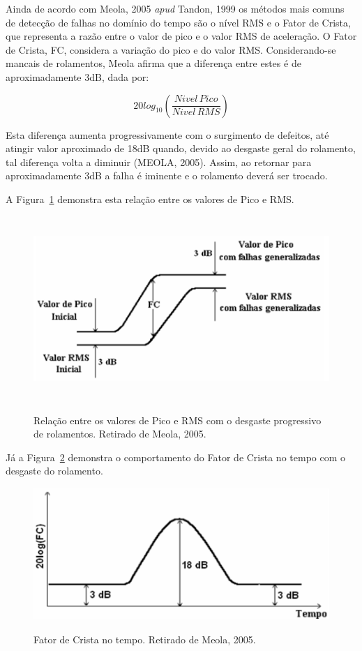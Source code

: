 \documentclass[
	12pt,				
	oneside,			
	a4paper,			
	english,			
	brazil,			
	]{abntex2ppgsi}
\begin{document}
Ainda de acordo com Meola, 2005 \textit{apud} Tandon, 1999 os métodos mais comuns de detecção de falhas no domínio do tempo são o nível RMS e o Fator de Crista, que representa a razão entre o valor de pico e o valor RMS de aceleração. O Fator de Crista, FC, considera a variação do pico e do valor RMS. Considerando-se mancais de rolamentos, Meola afirma que a diferença entre estes é de aproximadamente 3dB, dada por:

\begin{equation}
	20log_{10} \left ( \frac{Nivel \,Pico}{Nivel \, RMS} \right )
	\label{eq: Nível de Pico vs RMS}
\end{equation}

Esta diferença aumenta progressivamente com o surgimento de defeitos, até atingir valor aproximado de 18dB quando, devido ao desgaste geral do rolamento, tal diferença volta a diminuir (MEOLA, 2005). Assim, ao retornar para aproximadamente 3dB a falha é iminente e o rolamento deverá ser trocado. 

A Figura~\ref{RelacaoPicoaPicoeRMS} demonstra esta relação entre os valores de Pico e RMS.  

\begin{figure}[!htb]
\centering
\caption {Relação entre os valores de Pico e RMS com o desgaste progressivo de rolamentos. Retirado de Meola, 2005.}
\includegraphics[width=\textwidth,height=70mm,keepaspectratio]{Figura18}
\label{RelacaoPicoaPicoeRMS}
\end{figure}	

Já a Figura~\ref{FatorCrista} demonstra o comportamento do Fator de Crista no tempo com o desgaste do rolamento.

\begin{figure}[!htb]
\centering
\caption {Fator de Crista no tempo. Retirado de Meola, 2005.}
\includegraphics[width=\textwidth,height=50mm,keepaspectratio]{Figura19}
\label{FatorCrista}
\end{figure}	
\end{document}
